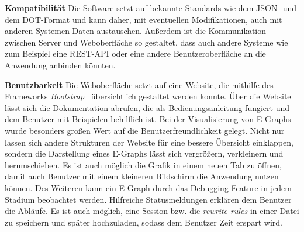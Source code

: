 \noindent\textbf{Kompatibilität} Die Software setzt auf bekannte Standards wie dem JSON- und dem DOT-Format und kann daher, mit eventuellen Modifikationen, auch mit anderen Systemen Daten austauschen.
Außerdem ist die Kommunikation zwischen Server und Weboberfläche so gestaltet, dass auch andere Systeme wie zum Beispiel eine REST-API oder eine andere Benutzeroberfläche an die Anwendung anbinden könnten.

\noindent\textbf{Benutzbarkeit} Die Weboberfläche setzt auf eine Website, die mithilfe des Frameworks \textit{Bootstrap}~\cite{bootstrap} übersichtlich gestaltet werden konnte.
Über die Website lässt sich die Dokumentation abrufen, die als Bedienungsanleitung fungiert und dem Benutzer mit Beispielen behilflich ist.
Bei der Visualisierung von E-Graphs wurde besonders großen Wert auf die Benutzerfreundlichkeit gelegt. Nicht nur lassen sich andere Strukturen der Website für eine bessere Übersicht 
einklappen, sondern die Darstellung eines E-Graphs lässt sich vergrößern, verkleinern und herumschieben. Es ist auch möglich die Grafik in einem neuen Tab zu öffnen, damit auch Benutzer
mit einem kleineren Bildschirm die Anwendung nutzen können.
Des Weiteren kann ein E-Graph durch das Debugging-Feature in jedem Stadium beobachtet werden. Hilfreiche Statusmeldungen erklären dem Benutzer die Abläufe.
Es ist auch möglich, eine Session bzw. die \textit{rewrite rules} in einer Datei zu speichern und später hochzuladen, sodass dem Benutzer Zeit erspart wird.
